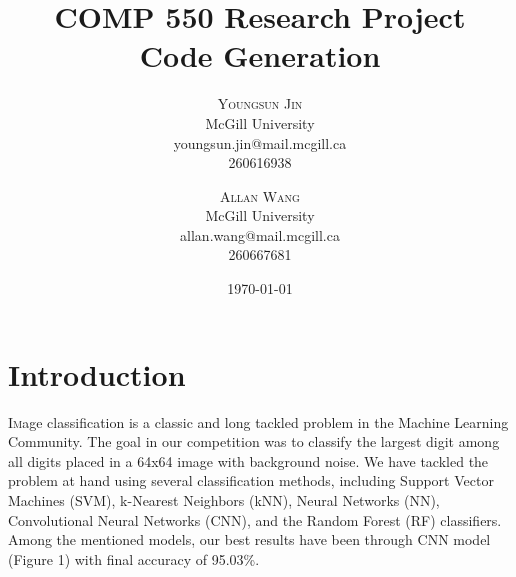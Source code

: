 \documentclass[twoside,twocolumn]{article}
\title{%
	\huge COMP 550 Research Project \\
	\large Code Generation}
\author{%
\textsc{Youngsun Jin} \\
\normalsize McGill University \\ 
\normalsize youngsun.jin@mail.mcgill.ca \\
\normalsize {260616938} 
\and 
\textsc{Allan Wang} \\
\normalsize McGill University \\ 
\normalsize allan.wang@mail.mcgill.ca \\
\normalsize {260667681} 
}
\date{\today} %
\begin{document}
\maketitle


\section{Introduction}

\lettrine[nindent=0em,lines=2]{I} mage classification is a classic and long tackled problem in the Machine Learning Community. The goal in our competition was to classify the largest digit among all digits placed in a 64x64 image with background noise. We have tackled the problem at hand using several classification methods, including Support Vector Machines (SVM), k-Nearest Neighbors (kNN), Neural Networks (NN), Convolutional Neural Networks (CNN), and the Random Forest (RF) classifiers. Among the mentioned models, our best results have been through CNN model (Figure 1) with final accuracy of 95.03\%.


\end{document}
